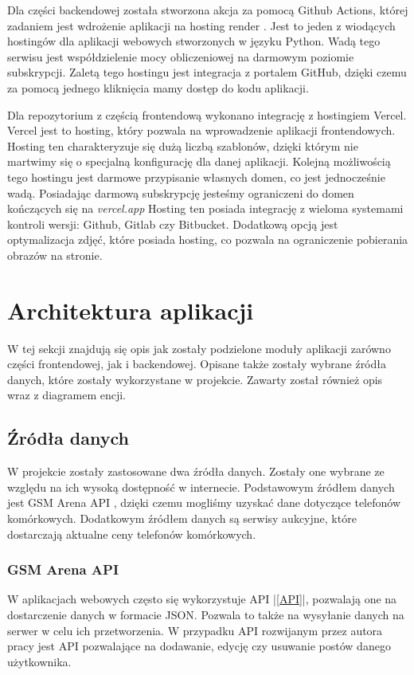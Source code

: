 Dla części backendowej została stworzona akcja za pomocą Github Actions, której zadaniem jest wdrożenie aplikacji na hosting render \cite{render}. Jest to jeden z wiodących hostingów \cite{render_top} dla aplikacji webowych stworzonych w języku Python. Wadą tego serwisu jest współdzielenie mocy obliczeniowej na darmowym poziomie subskrypcji. Zaletą tego hostingu jest integracja z portalem GitHub, dzięki czemu za pomocą jednego kliknięcia mamy dostęp do kodu aplikacji.

Dla repozytorium z częścią frontendową wykonano integrację z hostingiem Vercel. Vercel \cite{vercel} jest to hosting, który pozwala na wprowadzenie aplikacji frontendowych. Hosting ten charakteryzuje się dużą liczbą szablonów, dzięki którym nie martwimy się o specjalną konfigurację dla danej aplikacji. Kolejną możliwością tego hostingu jest darmowe przypisanie własnych domen, co jest jednocześnie wadą. Posiadając darmową subskrypcję jesteśmy ograniczeni do domen kończących się na \textit{vercel.app} Hosting ten posiada integrację z wieloma systemami kontroli wersji: Github, Gitlab czy Bitbucket. Dodatkową opcją jest optymalizacja zdjęć, które posiada hosting, co pozwala na ograniczenie pobierania obrazów na stronie.

\section{Architektura aplikacji}
W tej sekcji znajdują się opis jak zostały podzielone moduły aplikacji zarówno części frontendowej, jak i backendowej. Opisane także zostały wybrane źródła danych, które zostały wykorzystane w projekcie. Zawarty został również opis wraz z diagramem encji.

\subsection{Źródła danych} \label{data_sources}
W projekcie zostały zastosowane dwa źródła danych. Zostały one wybrane ze względu na ich wysoką dostępność w internecie.
Podstawowym źródłem danych jest \linebreak GSM Arena API \cite{gsm_arena_api}, dzięki czemu mogliśmy uzyskać dane dotyczące telefonów komórkowych. Dodatkowym źródłem danych są serwisy aukcyjne, które dostarczają aktualne ceny telefonów komórkowych.

\subsubsection{GSM Arena API}\label{api}
W aplikacjach webowych często się wykorzystuje API |\ref{API}|, pozwalają one na dostarczenie danych w formacie JSON. Pozwala to także na wysyłanie danych na serwer w celu ich przetworzenia. W przypadku API rozwijanym przez autora pracy jest API pozwalające na dodawanie, edycję czy usuwanie postów danego użytkownika.

